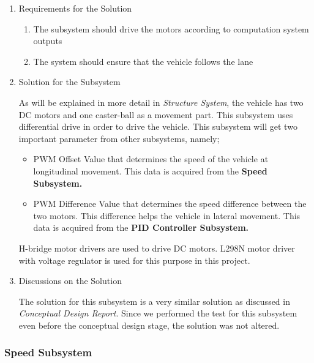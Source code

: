 \documentclass[a4paper,12pt]{article}
\begin{document}
		\begin{enumerate}
			\item {Requirements for the Solution}
			
			\begin{enumerate}
					\item The subsystem should drive the motors according to computation system outputs
					\item The system should ensure that the vehicle follows the lane 	
				\end{enumerate}
				
			\item {Solution for the Subsystem}
			
	As will be explained in more detail in \textit{Structure System}, the vehicle has two DC motors and one caster-ball as a movement part. This subsystem uses differential drive in order to drive the vehicle. This subsystem will get two important parameter from other subsystems, namely;
	
	\begin{itemize}
		\item PWM Offset Value that determines the speed of the vehicle at longitudinal movement. This data is acquired from the \textbf{Speed Subsystem.} 	
		\item PWM Difference Value that determines the speed difference between the two motors. This difference helps the vehicle in lateral movement. This data is acquired from the \textbf{PID Controller Subsystem.} 	
	\end{itemize}	
	
	  H-bridge motor drivers are used to drive DC motors. L298N motor driver with voltage regulator is used for this purpose in this project. 
			
			\item {Discussions on the Solution}
			
			The solution for this subsystem is a very similar solution as discussed in \textit{Conceptual Design Report}. Since we performed the test for this subsystem even before the conceptual design stage, the solution was not altered. 
			
			
		\end{enumerate}
			
	
			
		\subsubsection{Speed Subsystem}
		
\end{document}
